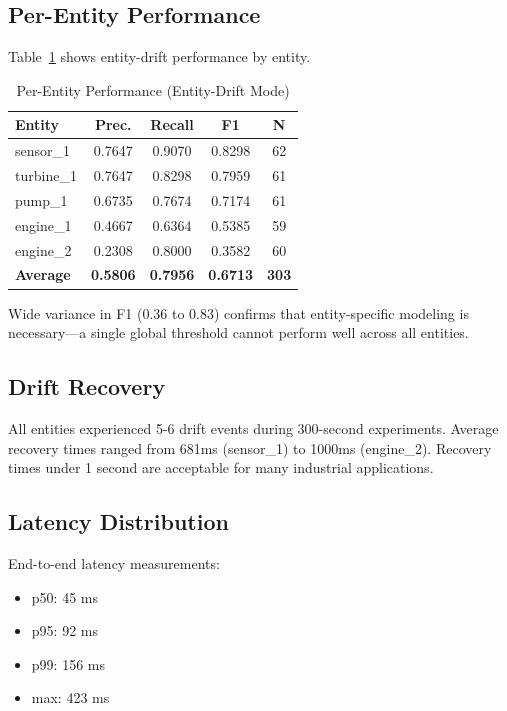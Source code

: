 \documentclass[conference]{IEEEtran}
\begin{document}
\subsection{Per-Entity Performance}

Table~\ref{tab:perentity} shows entity-drift performance by entity.

\begin{table}[htbp]
\caption{Per-Entity Performance (Entity-Drift Mode)}
\begin{center}
\begin{tabular}{lcccc}
\toprule
\textbf{Entity} & \textbf{Prec.} & \textbf{Recall} & \textbf{F1} & \textbf{N} \\
\midrule
sensor\_1 & 0.7647 & 0.9070 & 0.8298 & 62 \\
turbine\_1 & 0.7647 & 0.8298 & 0.7959 & 61 \\
pump\_1 & 0.6735 & 0.7674 & 0.7174 & 61 \\
engine\_1 & 0.4667 & 0.6364 & 0.5385 & 59 \\
engine\_2 & 0.2308 & 0.8000 & 0.3582 & 60 \\
\midrule
\textbf{Average} & \textbf{0.5806} & \textbf{0.7956} & \textbf{0.6713} & \textbf{303} \\
\bottomrule
\end{tabular}
\label{tab:perentity}
\end{center}
\end{table}

Wide variance in F1 (0.36 to 0.83) confirms that entity-specific modeling is necessary—a single global threshold cannot perform well across all entities.

\subsection{Drift Recovery}

All entities experienced 5-6 drift events during 300-second experiments. Average recovery times ranged from 681ms (sensor\_1) to 1000ms (engine\_2). Recovery times under 1 second are acceptable for many industrial applications.

\subsection{Latency Distribution}

End-to-end latency measurements:
\begin{itemize}
\item p50: 45 ms
\item p95: 92 ms
\item p99: 156 ms
\item max: 423 ms
\end{itemize}
\end{document}
